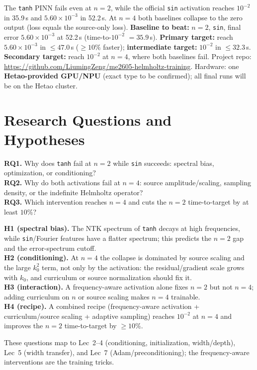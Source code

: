 \documentclass[10pt]{article}
\begin{document}
The \texttt{tanh} PINN fails even at $n=2$, while the official \texttt{sin} activation reaches $10^{-2}$ in 35.9\,s and $5.60\times10^{-3}$ in 52.2\,s. At $n=4$ both baselines collapse to the zero output (loss equals the source-only loss). \textbf{Baseline to beat:} $n=2$, \texttt{sin}, final error $5.60\times10^{-3}$ at 52.2\,s (time-to-$10^{-2}$ $=35.9$\,s). \textbf{Primary target:} reach $5.60\times10^{-3}$ in $\le47.0$\,s ($\ge10\%$ faster); \textbf{intermediate target:} $10^{-2}$ in $\le32.3$\,s. \textbf{Secondary target:} reach $10^{-2}$ at $n=4$, where both baselines fail. Project repo: \url{https://github.com/LiumingZeng/me2605-helmholtz-training}. Hardware: one \textbf{Hetao-provided GPU/NPU} (exact type to be confirmed); all final runs will be on the Hetao cluster.

\section{Research Questions and Hypotheses}

\textbf{RQ1.} Why does \texttt{tanh} fail at $n=2$ while \texttt{sin} succeeds: spectral bias, optimization, or conditioning?\\
\textbf{RQ2.} Why do both activations fail at $n=4$: source amplitude/scaling, sampling density, or the indefinite Helmholtz operator?\\
\textbf{RQ3.} Which intervention reaches $n=4$ and cuts the $n=2$ time-to-target by at least $10\%$?

\textbf{H1 (spectral bias).} The NTK spectrum of \texttt{tanh} decays at high frequencies, while \texttt{sin}/Fourier features have a flatter spectrum; this predicts the $n=2$ gap and the error-spectrum cutoff.\\
\textbf{H2 (conditioning).} At $n=4$ the collapse is dominated by source scaling and the large $k_0^2$ term, not only by the activation: the residual/gradient scale grows with $k_0$, and curriculum or source normalization should fix it.\\
\textbf{H3 (interaction).} A frequency-aware activation alone fixes $n=2$ but not $n=4$; adding curriculum on $n$ or source scaling makes $n=4$ trainable.\\
\textbf{H4 (recipe).} A combined recipe (frequency-aware activation + curriculum/source scaling + adaptive sampling) reaches $10^{-2}$ at $n=4$ and improves the $n=2$ time-to-target by $\ge10\%$.

These questions map to Lec~2--4 (conditioning, initialization, width/depth), Lec~5 (width transfer), and Lec~7 (Adam/preconditioning); the frequency-aware interventions are the training tricks.
\end{document}
